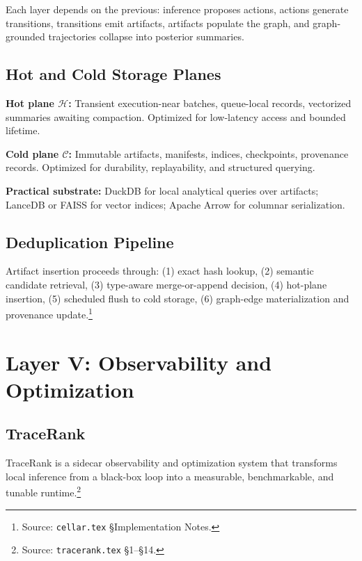 \documentclass[11pt]{article}
\theoremstyle{remark}
\newcommand{\hot}{\mathcal{H}}
\newcommand{\cold}{\mathcal{C}}
\begin{document}
Each layer depends on the previous: inference proposes actions, actions generate transitions, transitions emit artifacts, artifacts populate the graph, and graph-grounded trajectories collapse into posterior summaries.

\subsection{Hot and Cold Storage Planes}
\label{subsec:storage}

\textbf{Hot plane $\hot$:} Transient execution-near batches, queue-local records, vectorized summaries awaiting compaction. Optimized for low-latency access and bounded lifetime.

\textbf{Cold plane $\cold$:} Immutable artifacts, manifests, indices, checkpoints, provenance records. Optimized for durability, replayability, and structured querying.

\textbf{Practical substrate:} DuckDB for local analytical queries over artifacts; LanceDB or FAISS for vector indices; Apache Arrow for columnar serialization.

\subsection{Deduplication Pipeline}
\label{subsec:dedup}

Artifact insertion proceeds through: (1) exact hash lookup, (2) semantic candidate retrieval, (3) type-aware merge-or-append decision, (4) hot-plane insertion, (5) scheduled flush to cold storage, (6) graph-edge materialization and provenance update.\footnote{Source: \texttt{cellar.tex} \S Implementation Notes.}

\section{Layer V: Observability and Optimization}
\label{sec:observability}

\subsection{TraceRank}
\label{subsec:tracerank}

TraceRank is a sidecar observability and optimization system that transforms local inference from a black-box loop into a measurable, benchmarkable, and tunable runtime.\footnote{Source: \texttt{tracerank.tex} \S1--\S14.}
\end{document}
